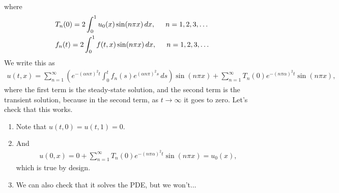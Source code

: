 \documentclass{article}
\theoremstyle{definition}
\begin{document}
\begin{enumerate}
\begin{align*}
	\end{align*}
	where
	\begin{align*}
	&T_n(0) = 2\int^1_0 u_0(x)\sin(n\pi x)\,dx, \hspace{0.5cm}n=1,2,3,\dots\\
	&f_n(t) = 2\int^1_0 f(t,x)\sin(n\pi x)\,dx, \hspace{0.5cm}n=1,2,3,\dots
	\end{align*}
	We write this as
	\begin{align*}
	u(t,x) = \sum^\infty_{n=1} \left(e^{-(\alpha n\pi)^2t}\int_0^t f_n(s) e^{(\alpha n \pi)^2s} \,ds \right)\sin(n\pi x) + \sum^\infty_{n=1}T_n(0)e^{-(n\pi \alpha)^2t}\sin(n\pi x),
	\end{align*}
	where the first term is the steady-state solution, and the second term is the transient solution, because in the second term, as $t\to \infty$ it goes to zero. Let's check that this works. 
	\begin{enumerate}
		\item Note that $u(t,0) = u(t,1) = 0.$
		\item And
		\begin{align*}
		u(0,x) = 0 + \sum^\infty_{n=1}T_n(0)e^{-(n\pi \alpha)^2t}\sin(n\pi x) = u_0(x),
		\end{align*}
		which is true by design.
		\item We can also check that it solves the PDE, but we won't...
	\end{enumerate}
	
\end{enumerate}
\end{document}
